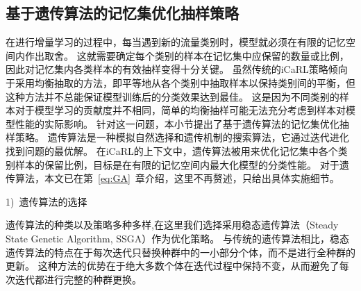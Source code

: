 \subsection{基于遗传算法的记忆集优化抽样策略}
在进行增量学习的过程中，每当遇到新的流量类别时，模型就必须在有限的记忆空间内作出取舍。
这就需要确定每个类别的样本在记忆集中应保留的数量或比例，因此对记忆集内各类样本的有效抽样变得十分关键。
虽然传统的iCaRL策略倾向于采用均衡抽取的方法，即平等地从各个类别中抽取样本以保持类别间的平衡，但这种方法并不总能保证模型训练后的分类效果达到最佳。
这是因为不同类别的样本对于模型学习的贡献度并不相同，简单的均衡抽样可能无法充分考虑到样本对模型性能的实际影响。
针对这一问题，本小节提出了基于遗传算法的记忆集优化抽样策略。
遗传算法是一种模拟自然选择和遗传机制的搜索算法，它通过迭代进化找到问题的最优解。
在iCaRL的上下文中，遗传算法被用来优化记忆集中各个类别样本的保留比例，目标是在有限的记忆空间内最大化模型的分类性能。
对于遗传算法，本文已在第~\ref{eq:GA}~章介绍，这里不再赘述，只给出具体实施细节。\par

1)~遗传算法的选择\par
遗传算法的种类以及策略多种多样,在这里我们选择采用稳态遗传算法（Steady State Genetic Algorithm, SSGA）作为优化策略。
与传统的遗传算法相比，稳态遗传算法的特点在于每次迭代只替换种群中的一小部分个体，而不是进行全种群的更新。
这种方法的优势在于绝大多数个体在迭代过程中保持不变，从而避免了每次迭代都进行完整的种群更换。\par

